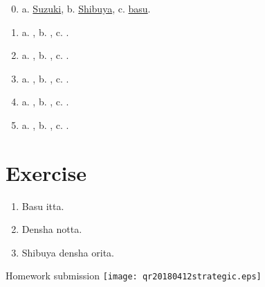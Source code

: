 \documentclass[uplatex,a4paper]{jsarticle}
\begin{document}
\begin{enumerate}
\setcounter{enumi}{-1}   
 \item a. \underline{ Suzuki\hspace{6.4zw}}, b. \underline{ Shibuya\hspace{10.4zw}}, c. \underline{ basu\hspace{13.2zw}}.
 \item a. \underline{\hspace{10zw}}, b. \underline{\hspace{15zw}}, c. \hrulefill.
 \item a. \underline{\hspace{10zw}}, b. \underline{\hspace{15zw}}, c. \hrulefill.
 \item a. \underline{\hspace{10zw}}, b. \underline{\hspace{15zw}}, c. \hrulefill.
 \item a. \underline{\hspace{10zw}}, b. \underline{\hspace{15zw}}, c. \hrulefill.
 \item a. \underline{\hspace{10zw}}, b. \underline{\hspace{15zw}}, c. \hrulefill.
\end{enumerate}

\section{Exercise}

\begin{enumerate}
 \item Basu \underline{\hspace{10zw}} itta.
 \item Densha  \underline{\hspace{10zw}} notta.
 \item Shibuya \underline{\hspace{10zw}} densha \underline{\hspace{10zw}} orita.
\end{enumerate}

\ifQR
\vspace*{-4\baselineskip}
\begin{flushright}
Homework submission \texttt{[image: qr20180412strategic.eps]}
\end{flushright}
\fi%
\end{document}
